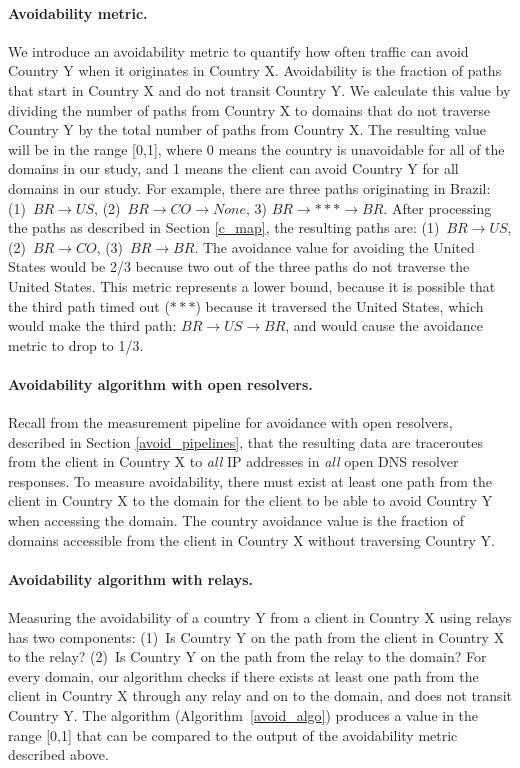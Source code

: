 \paragraph{Avoidability metric.}  We introduce an avoidability metric to
quantify how often
traffic can avoid Country Y when it originates in Country X.
Avoidability is the fraction of paths that start in Country
X and do not transit Country Y.  We calculate this value by dividing the
number of paths from Country X to domains that do not traverse Country Y
by the total number of paths from Country X. The resulting value will be
in the range [0,1], where 0 means the country is unavoidable for all of
the domains in our study, and 1 means the client can avoid Country Y for
all domains in our study.  For example, there are three paths
originating in Brazil: (1)~$BR \rightarrow US$, (2)~$BR \rightarrow CO
\rightarrow None$, 3) $BR \rightarrow *** \rightarrow BR$.  After
processing the paths as described in Section \ref{c_map}, the resulting
paths are: (1)~$BR \rightarrow US$, (2)~$BR \rightarrow CO$, (3)~$BR
\rightarrow BR$.  The avoidance value for avoiding the United States
would be 2/3 because two out of the three paths do not traverse the
United States.  This metric represents a lower bound,
because it is possible that the third path timed out ($***$) because it
traversed the United States, which would make the third path: $BR
\rightarrow US \rightarrow BR$, and would cause the avoidance metric to
drop to 1/3.

\paragraph{Avoidability algorithm with open resolvers.} Recall from the measurement pipeline for avoidance with open resolvers, described in Section \ref{avoid_pipelines}, that the resulting data are traceroutes from the client in Country X to \textit{all} IP addresses in \textit{all} open DNS resolver responses.  To measure avoidability, there must exist at least one path from the client in Country X to the domain for the client to be able to avoid Country Y when accessing the domain.  The country avoidance value is the fraction of domains accessible from the client in Country X without traversing Country Y.

\paragraph{Avoidability algorithm with relays.}  Measuring the avoidability of a country Y from a client in Country X using relays has two components: (1)~Is Country Y on the path from the client in Country X to the relay?  (2)~Is Country Y on the path from the relay to the domain?  For every domain, our algorithm checks if there exists at least one path from the client in Country X through any relay and on to the domain, and does not transit Country Y.  
The algorithm (Algorithm~\ref{avoid_algo}) produces a value in the range
[0,1] that can be compared to the output of the avoidability metric
described above.   

